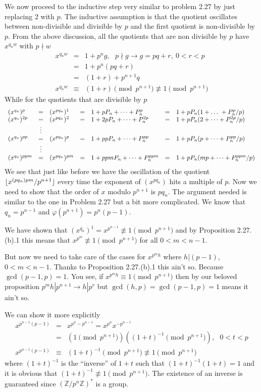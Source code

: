 \documentclass[aps,preprint,preprintnumbers,nofootinbib,showpacs,prd]{revtex4-1}
\newcommand{\nbea}{\begin{eqnarray*}}
\newcommand{\neea}{\end{eqnarray*}}
\DeclarePairedDelimiter{\floor}{\lfloor}{\rfloor}
\begin{document}
We now proceed to the inductive step very similar to problem 2.27 by just replacing 2 with $p$. The inductive assumption is that the quotient oscillates between non-divisible and divisible by $p$ and the first quotient is non-divisible by $p$. From the above discussion, all the quotients that are non divisible by $p$ have $x^{q_n w}$ with $p \nmid w$
%
\nbea
x^{q_n w} & = & 1 + p^n g, ~~~p\nmid g \to g = pq + r, ~ 0 < r < p \\
& = & 1 + p^n(pq + r) \\
& = & (1 + r) + p^{n+1}q \\
x^{q_n w} & \equiv & (1 + r) \pmod{p^{n+1}} \not\equiv 1 \pmod{p^{n+1}}
\neea
%
While for the quotients that are divisible by $p$
%
\nbea
\begin{array} {l c l c l c l}
(x^{q_n})^p & = & (x^{pq_n})^1 & = & 1 + pP_n + \dots +  P_n^p & = & 1 + pP_n(1 + \dots\ + P^p_n/p) \\
(x^{q_n})^{2p} & = & (x^{pq_n})^2 & = & 1 + 2pP_n + \dots + P_n^{2p} & = & 1 + pP_n(2 + \dots + P_n^{2p}/p) \\
& \vdots & & & & & \\
(x^{q_n})^{pp} & = & (x^{pq_n})^{p} & = & 1 + ppP_n + \dots + P_n^{pp} & = & 1 + pP_n(p + \dots + P_n^{pp}/p) \\
& \vdots & & & & & \\
(x^{q_n})^{ppm} & = & (x^{pq_n})^{pm} & = & 1 + ppmP_n + \dots + P_n^{ppm} & = & 1 + pP_n(mp + \dots + P_n^{ppm}/p)
\end{array}
\neea
%
We see that just like before we have the oscillation of the quotient $\floor{x^{(pq_n)pm}/p^{n+1}}$ every time the exponent of $(x^{pq_n})$ hits a multiple of $p$. Now we need to show that the order of $x$ modulo $p^{n+1}$ is $pq_n$. The argument needed is similar to the one in Problem 2.27 but a bit more complicated. We know that $q_n = p^{n-1}$ and $\varphi(p^{n+1}) = p^{n}(p-1)$.

We have shown that $(x^{q_n})^1  = x^{p^{n-1}} \not\equiv 1 \pmod{p^{n+1}}$ and by Proposition 2.27.(b).1 this means that $x^{p^m} \not\equiv 1 \pmod{p^{n+1}}$ for all $0 < m < n-1$.

But now we need to take care of the cases for $x^{p^m h}$ where $h | (p-1)$, $0 < m < n-1$. Thanks to Proposition 2.27.(b).1 this ain't so. Because $\gcd(p-1,p)=1$. You see, if $x^{p^m h} \equiv 1 \pmod{p^{n+1}}$ then by our beloved proposition $p^{m}h|p^{n+1} \to h | p^v$ but $\gcd(h,p)=\gcd(p-1,p)=1$ means it ain't so.

We can show it more explicitly
%
\nbea
x^{p^{n-1}(p-1)} & = & x^{p^{n}-p^{n-1}} = x^{p^{n}} x^{-p^{n-1}} \\
& = & (1 \pmod{p^{n+1}}) ((1+t)^{-1} \pmod{p^{n+1}}), ~~~ 0 < t < p \\
x^{p^{n-1}(p-1)} & \equiv & (1+t)^{-1} \pmod{p^{n+1}} \not\equiv 1 \pmod{p^{n+1}}
\neea
%
where $(1+t)^{-1}$ is the ``inverse'' of $1+t$ such that $ (1+t)^{-1}(1+t) = 1$ and it is obvious that $(1+t)^{-1} \not\equiv 1 \pmod{p^{n+1}}$. The existence of an inverse is guaranteed since $(\mathbb{Z}/p^{n}\mathbb{Z})^*$ is a group.
\end{document}

